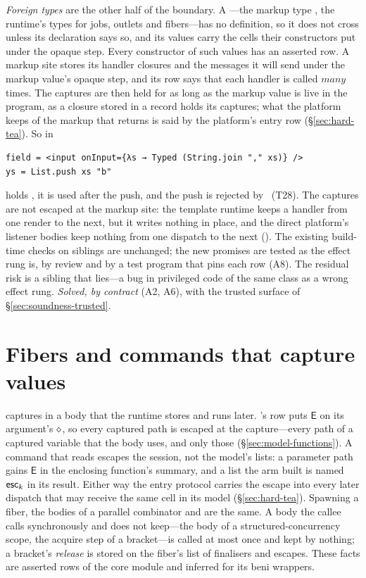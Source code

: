 \emph{Foreign types} are the other half of the boundary. A ---the markup type
, the runtime's types for jobs, outlets and fibers---has no definition, so it does not
cross unless its declaration says so, and its values carry the cells their constructors put under the
opaque step. Every constructor of such values has an asserted row. A markup site stores its handler
closures and the messages it will send under the markup value's opaque step, and its row says that each
handler is called $\mathit{many}$ times. The captures are then held for as long as the markup value is
live in the program, as a closure stored in a record holds its captures; what the platform keeps of the
markup that  returns is said by the platform's entry row (\S\ref{sec:hard-tea}). So in
\begin{Verbatim}
field = <input onInput={λs → Typed (String.join "," xs)} />
ys = List.push xs "b"
\end{Verbatim}
 holds , it is used after the push, and the push is rejected by \Dead\ (T28). The
captures are not escaped at the markup site: the template runtime keeps a handler from one render to the
next, but it writes nothing in place, and the direct platform's listener bodies keep nothing from one
dispatch to the next (). The existing build-time checks
on siblings are unchanged; the new promises are tested as the effect rung is, by review and by a test
program that pins each row (A8). The residual risk is a sibling that lies---a bug in privileged code of
the same class as a wrong effect rung. \emph{Solved, by contract} (A2, A6), with the trusted surface of
\S\ref{sec:soundness-trusted}.

\section{Fibers and commands that capture values}
\label{sec:hard-fibers}

 captures  in a body that the runtime stores and runs
later. 's row puts $\mathsf{E}$ on its argument's $\diamond$, so every captured path is
escaped at the capture---every path of a captured variable that the body uses, and only those
(\S\ref{sec:model-functions}). A command that reads  escapes the session, not the
model's lists: a parameter path gains $\mathsf{E}$ in the enclosing function's
summary, and a list the arm built is named $\mathsf{esc}_k$ in its result. Either way the entry protocol carries
the escape into every later dispatch that may receive the same cell in its model (\S\ref{sec:hard-tea}).
Spawning a fiber, the bodies of a parallel combinator and  are the same. A body the callee
calls synchronously and does not keep---the body of a structured-concurrency scope, the acquire step of a
bracket---is called at most once and kept by nothing; a bracket's \emph{release} is stored on the fiber's
list of finalisers and escapes. These facts are asserted rows of the core  module and
inferred for its beni wrappers.

